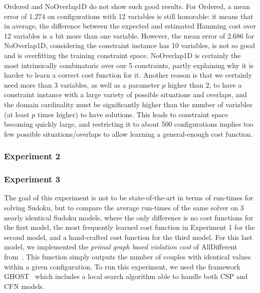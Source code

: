 \documentclass{article}
\newcommand{\csp}{\textsc{CSP}\xspace}
\newcommand{\cfn}{\textsc{CFN}\xspace}
\newcommand{\ghost}{\textsc{GHOST}\xspace}
\begin{document}
Ordered and NoOverlap1D do not show such good results. For Ordered, a mean error of 1.274 on configurations with 12 variables is still honorable: it means that in average, the difference between the expected and estimated Hamming cost over 12 variables is a bit more than one variable. However, the mean error of 2.686 for NoOverlap1D, considering the constraint instance has 10 variables, is not so good and is overfitting the training constraint space. NoOverlap1D is certainly the most intrinsically combinatoric over our 5 constraints, partly explaining why it is harder to learn a correct cost function for it. Another reason is that we certainly need more than 3 variables, as well as a parameter $p$ higher than 2, to have a constraint instance with a large variety of possible situations and overlaps, and the domain cardinality must be significantly higher than the number of variables (at least $p$ times higher) to have solutions. This leads to constraint space becoming quickly large, and restricting it to about 500 configurations implies too few possible situations/overlaps to allow learning a general-enough cost function.

\subsubsection{Experiment 2}

\subsubsection{Experiment 3}

The goal of this experiment is not to be state-of-the-art in terms of run-times for solving Sudoku, but to compare the average run-times of the same solver on 3 nearly identical Sudoku models, where the only difference is no cost functions for the first model, the most frequently learned cost function in Experiment 1 for the second model, and a hand-crafted cost function for the third model. For this last model, we implemented the \textit{primal graph based violation cost} of AllDifferent from~\cite{Petit2001}. This function simply outputs the number of couples with identical values within a given configuration. To run this experiment, we used the framework \ghost~\cite{GHOST} which includes a local search algorithm able to handle both \csp and \cfn models.
\end{document}
